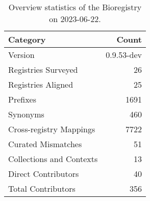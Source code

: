 \begin{table}
\caption{Overview statistics of the Bioregistry on 2023-06-22.}
\label{tab:bioregistry-summary}
\begin{tabular}{lr}
\toprule
Category & Count \\
\midrule
Version & 0.9.53-dev \\
Registries Surveyed & 26 \\
Registries Aligned & 25 \\
Prefixes & 1691 \\
Synonyms & 460 \\
Cross-registry Mappings & 7722 \\
Curated Mismatches & 51 \\
Collections and Contexts & 13 \\
Direct Contributors & 40 \\
Total Contributors & 356 \\
\bottomrule
\end{tabular}
\end{table}
